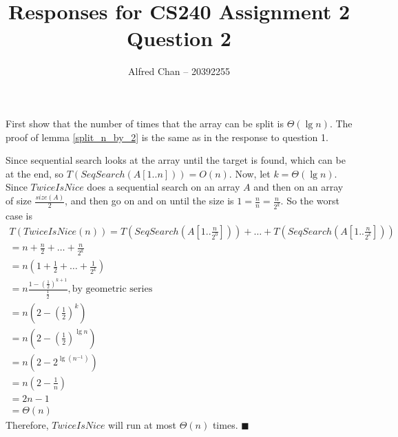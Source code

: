 \documentclass[12pt]{article}
\title{Responses for CS240 Assignment 2 Question 2}
\author{Alfred Chan -- 20392255}
\begin{document}
\maketitle
First show that the number of times that the array can be split is $\Theta(\lg n)$. The proof of lemma \ref{split_n_by_2} is the same as in the response to question 1.

Since sequential search looks at the array until the target is found, which can be at the end, so $T(SeqSearch(A[1..n])) = O(n)$.
Now, let $k = \Theta(\lg n)$.
Since $TwiceIsNice$ does a sequential search on an array $A$ and then on an array of size $\frac{size(A)}{2}$, and then go on and on until the size is 
$1 = \frac{n}{n} = \frac{n}{2^k}$.
So the worst case is
\begin{gather*}
T(TwiceIsNice(n)) = T(SeqSearch(A[1..\frac{n}{2^0}])) + \dots + T(SeqSearch(A[1 .. \frac{n}{2^k}]))\\
	= n + \frac{n}{2} + \dots + \frac{n}{2^k}\\
	= n (1 + \frac{1}{2} + \dots + \frac{1}{2^k})\\
	= n \frac{1 - (\frac{1}{2})^{k+1}}{\frac{1}{2}}, \text{by geometric series}\\
	= n (2 - (\frac{1}{2})^{k})\\
	= n (2 - (\frac{1}{2})^{\lg n})\\
	= n (2 - 2^{\lg (n^{-1})})\\
	= n (2 - \frac{1}{n})\\
	= 2n - 1\\
	= \Theta(n)
\end{gather*}
Therefore, $TwiceIsNice$ will run at most $\Theta(n)$ times.
\hfill $\blacksquare$
\end{document}
